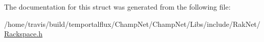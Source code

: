 The documentation for this struct was generated from the following file\-:\begin{DoxyCompactItemize}
\item 
/home/travis/build/temportalflux/\-Champ\-Net/\-Champ\-Net/\-Libs/include/\-Rak\-Net/\hyperlink{_rackspace_8h}{Rackspace.\-h}\end{DoxyCompactItemize}

